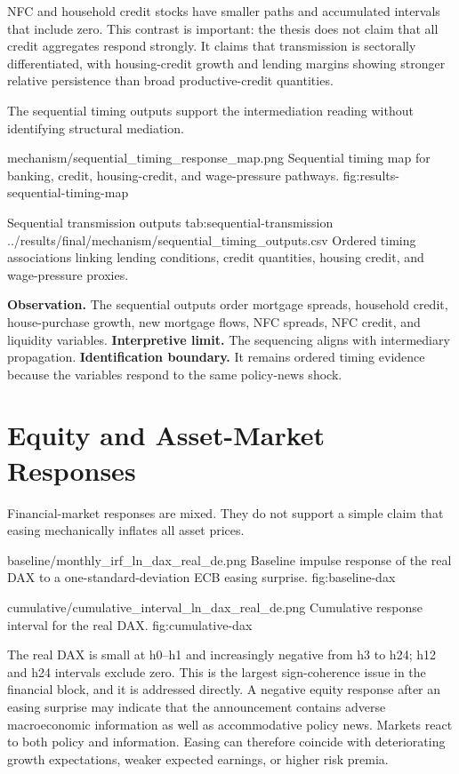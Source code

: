 NFC and household credit stocks have smaller paths and accumulated intervals that include zero. This contrast is important: the thesis does not claim that all credit aggregates respond strongly. It claims that transmission is sectorally differentiated, with housing-credit growth and lending margins showing stronger relative persistence than broad productive-credit quantities.

The sequential timing outputs support the intermediation reading without identifying structural mediation.

\thesisfigure
  {mechanism/sequential_timing_response_map.png}
  {Sequential timing map for banking, credit, housing-credit, and wage-pressure pathways.}
  {fig:results-sequential-timing-map}

\artifacttable
  {Sequential transmission outputs}
  {tab:sequential-transmission}
  {../results/final/mechanism/sequential_timing_outputs.csv}
  {Ordered timing associations linking lending conditions, credit quantities, housing credit, and wage-pressure proxies.}

\textbf{Observation.} The sequential outputs order mortgage spreads, household credit, house-purchase growth, new mortgage flows, NFC spreads, NFC credit, and liquidity variables. \textbf{Interpretive limit.} The sequencing aligns with intermediary propagation. \textbf{Identification boundary.} It remains ordered timing evidence because the variables respond to the same policy-news shock.

\section{Equity and Asset-Market Responses}

Financial-market responses are mixed. They do not support a simple claim that easing mechanically inflates all asset prices.

\thesisfigure
  {baseline/monthly_irf_ln_dax_real_de.png}
  {Baseline impulse response of the real DAX to a one-standard-deviation ECB easing surprise.}
  {fig:baseline-dax}

\thesisfigure
  {cumulative/cumulative_interval_ln_dax_real_de.png}
  {Cumulative response interval for the real DAX.}
  {fig:cumulative-dax}

The real DAX is small at h0--h1 and increasingly negative from h3 to h24; h12 and h24 intervals exclude zero. This is the largest sign-coherence issue in the financial block, and it is addressed directly. A negative equity response after an easing surprise may indicate that the announcement contains adverse macroeconomic information as well as accommodative policy news. Markets react to both policy and information. Easing can therefore coincide with deteriorating growth expectations, weaker expected earnings, or higher risk premia.

